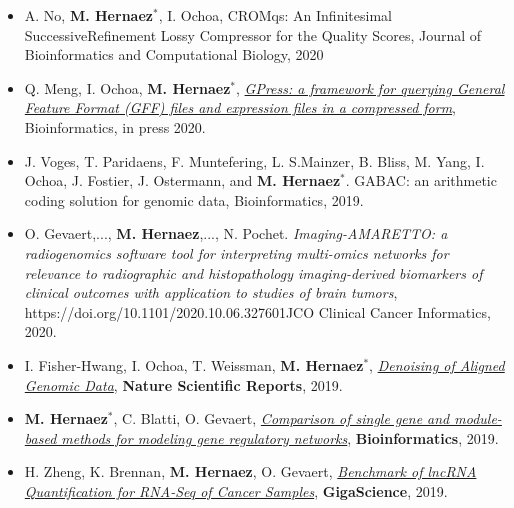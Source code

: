 \documentclass[11pt,a4paper,sans]{moderncv}        %
\begin{document}
\begin{itemize}

\item A. No, \textbf{M. Hernaez}$^\ast$, I. Ochoa, CROMqs: An Infinitesimal SuccessiveRefinement Lossy Compressor for the Quality Scores, Journal of Bioinformatics and Computational Biology, 2020\\

\item Q. Meng, I. Ochoa, \textbf{M. Hernaez}$^\ast$,  \href{https://www.biorxiv.org/content/10.1101/833087v1.full}{\textsl{GPress: a framework for querying General Feature Format (GFF) files and expression files in a compressed form}}, Bioinformatics, in press 2020.\\

\item J. Voges, T. Paridaens, F. Muntefering, L. S.Mainzer, B. Bliss, M. Yang, I. Ochoa, J. Fostier, J. Ostermann, and \textbf{M. Hernaez}$^\ast$. GABAC: an arithmetic coding solution for genomic data, Bioinformatics, 2019. \\

\item O. Gevaert,..., \textbf{M. Hernaez},..., N. Pochet. \textsl{Imaging-AMARETTO: a radiogenomics software tool for interpreting multi-omics networks for relevance to radiographic and histopathology imaging-derived biomarkers of clinical outcomes with application to studies of brain tumors},  https://doi.org/10.1101/2020.10.06.327601JCO Clinical Cancer Informatics, 2020. \\

\item I. Fisher-Hwang, I. Ochoa,  T. Weissman, \textbf{M. Hernaez}$^\ast$, \href{https://www.nature.com/articles/s41598-019-51418-z}{\textsl{Denoising of Aligned Genomic Data}}, \textbf{Nature Scientific Reports}, 2019.\\

\item \textbf{M. Hernaez}$^\ast$, C. Blatti, O. Gevaert, \href{https://academic.oup.com/bioinformatics/advance-article-abstract/doi/10.1093/bioinformatics/btz549/5530163?redirectedFrom=fulltext}{\textsl{Comparison of single gene and module-based methods for modeling gene regulatory networks}}, \textbf{Bioinformatics}, 2019.\\

\item H. Zheng, K. Brennan, \textbf{M. Hernaez}, O. Gevaert, \href{https://www.biorxiv.org/content/early/2018/01/09/241869}{\textsl{Benchmark of lncRNA Quantification for RNA-Seq of Cancer Samples}}, \textbf{GigaScience}, 2019.\\


\end{itemize}
\end{document}
